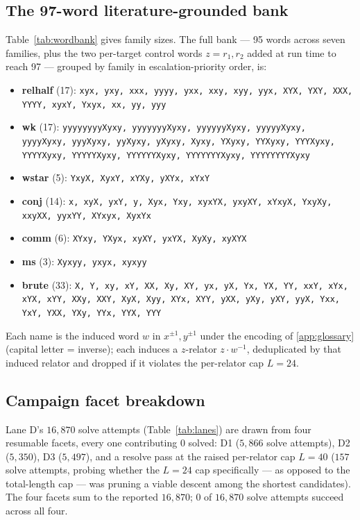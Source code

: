 \subsection{The 97-word literature-grounded bank}

Table~\ref{tab:wordbank} gives family sizes. The full bank --- 95 words across seven
families, plus the two per-target control words $z=r_1,r_2$ added at run time to reach 97 ---
grouped by family in escalation-priority order, is:

\begin{itemize}
  \item \textbf{relhalf} (17): \texttt{xyx, yxy, xxx, yyyy, yxx, xxy, xyy, yyx, XYX, YXY,
    XXX, YYYY, xyxY, Yxyx, xx, yy, yyy}
  \item \textbf{wk} (17): \texttt{yyyyyyyyXyxy, yyyyyyyXyxy, yyyyyyXyxy, yyyyyXyxy,
    yyyyXyxy, yyyXyxy, yyXyxy, yXyxy, Xyxy, YXyxy, YYXyxy, YYYXyxy, YYYYXyxy, YYYYYXyxy,
    YYYYYYXyxy, YYYYYYYXyxy, YYYYYYYYXyxy}
  \item \textbf{wstar} (5): \texttt{YxyX, XyxY, xYXy, yXYx, xYxY}
  \item \textbf{conj} (14): \texttt{x, xyX, yxY, y, Xyx, Yxy, xyxYX, yxyXY, xYxyX, YxyXy,
    xxyXX, yyxYY, XYxyx, XyxYx}
  \item \textbf{comm} (6): \texttt{XYxy, YXyx, xyXY, yxYX, XyXy, xyXYX}
  \item \textbf{ms} (3): \texttt{Xyxyy, yxyx, xyxyy}
  \item \textbf{brute} (33): \texttt{X, Y, xy, xY, XX, Xy, XY, yx, yX, Yx, YX, YY, xxY, xYx,
    xYX, xYY, XXy, XXY, XyX, Xyy, XYx, XYY, yXX, yXy, yXY, yyX, Yxx, YxY, YXX, YXy, YYx, YYX,
    YYY}
\end{itemize}

Each name is the induced word $w$ in $x^{\pm1},y^{\pm1}$ under the encoding of
\ref{app:glossary} (capital letter = inverse); each induces a $z$-relator $z\cdot w^{-1}$,
deduplicated by that induced relator and dropped if it violates the per-relator cap $L=24$.

\subsection{Campaign facet breakdown}

Lane D's $16{,}870$ solve attempts (Table~\ref{tab:lanes}) are drawn from four resumable
facets, every one contributing $0$ solved: D1 ($5{,}866$ solve attempts), D2 ($5{,}350$),
D3 ($5{,}497$), and a resolve pass at the raised per-relator cap $L=40$ ($157$ solve
attempts, probing whether the $L=24$ cap specifically --- as opposed to the total-length cap
--- was pruning a viable descent among the shortest candidates). The four facets sum to the
reported $16{,}870$; $0$ of $16{,}870$ solve attempts succeed across all four.

